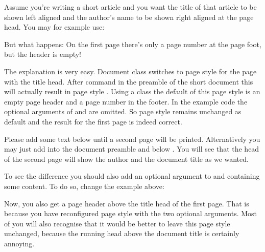 \begin{Example}
  Assume you're writing a short article and you want the title of that
  article to be shown left aligned and the author's name to be
  shown right aligned at the page head. You may for example use:
  But what happens: On the first page there's only a page number at the page
  foot, but the header is empty!

  The explanation is very easy. Document class  switches to
  page style  for the page with the title head. After command
   in the preamble of
  the short document this will actually result in page style
  . Using a \KOMAScript{} class the default of
  this page style is an empty page header and a page number in the footer. In
  the example code the optional arguments of  and 
  are omitted. So page style  remains unchanged
  as default and the result for the first page is indeed correct.

  Please add some text below  until a second
  page will be printed. Alternatively you may just add
   into the document
  preamble and  below
  . You will see that the head of the second
  page will show the author and the document title as we wanted.

  To see the difference you should also add an optional argument to
   and  containing some content. To do so, change
  the example above:
  Now, you also get a page header above the title head of the first
  page. That is because you have reconfigured page style
   with the two optional arguments. Most of you
  will also recognise that it would be better to leave this page style
  unchanged, because the running head above the document title is certainly
  annoying.
\end{Example}

